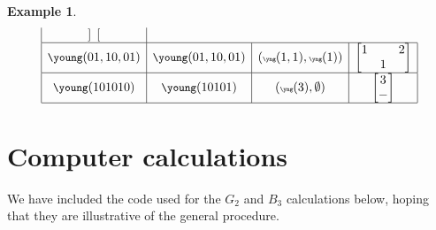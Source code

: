 \documentclass{amsart}
\numberwithin{equation}{section}
\theoremstyle{definition}
\newtheorem{example}[lemma]{Example}%
\begin{document}
\begin{example}
$$\begin{array}{|c|c|c|c|}
\begin{bmatrix}
\end{bmatrix}\\\hline
{\small \young(01,10,01)}&  {\small \young(01,10,01)}& ({\tiny \yng(1,1),\yng(1)}) &  \begin{bmatrix}
1&&2\\&1& 
\end{bmatrix}   \\\hline
{\small \young(101010)}&  {\small \young(10101)}&  ({\tiny \yng(3),\tiny{\emptyset}}) &  \begin{bmatrix}
3\\- 
\end{bmatrix}   \\\hline
\end{array}
$$


\end{example}

\section{Computer calculations}
\label{sec:examples}




We have included the code used for the $G_2$ and $B_3$ calculations below, hoping that they are illustrative of the general procedure. 
\end{document}
